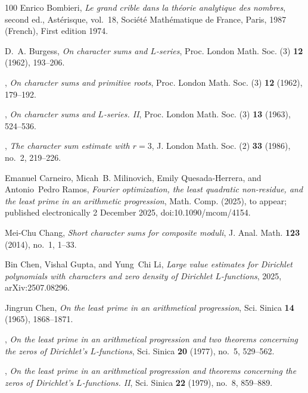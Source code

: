 \documentclass[11pt]{amsart}
\numberwithin{equation}{section}
\theoremstyle{plain}
\theoremstyle{definition}
\theoremstyle{remark}
\newcommand{\1}{\mathbf{1}}
\begin{document}
\begin{thebibliography}{100}
Enrico Bombieri, \emph{Le grand crible dans la th{\'e}orie analytique des
  nombres}, second ed., Ast{\'e}risque, vol.~18, Soci{\'e}t{\'e}
  Math{\'e}matique de France, Paris, 1987 (French), First edition 1974.

D.~A. Burgess, \emph{On character sums and {$L$}-series}, Proc. London Math.
  Soc. (3) \textbf{12} (1962), 193--206.

\bysame, \emph{On character sums and primitive roots}, Proc. London Math. Soc.
  (3) \textbf{12} (1962), 179--192.

\bysame, \emph{On character sums and {$L$}-series. {II}}, Proc. London Math.
  Soc. (3) \textbf{13} (1963), 524--536.

\bysame, \emph{The character sum estimate with {$r=3$}}, J. London Math. Soc.
  (2) \textbf{33} (1986), no.~2, 219--226.

Emanuel Carneiro, Micah~B. Milinovich, Emily Quesada-Herrera, and Antonio~Pedro
  Ramos, \emph{Fourier optimization, the least quadratic non-residue, and the
  least prime in an arithmetic progression}, Math. Comp. (2025), to appear;
  published electronically 2 December 2025, doi:10.1090/mcom/4154.

Mei-Chu Chang, \emph{Short character sums for composite moduli}, J. Anal. Math.
  \textbf{123} (2014), no.~1, 1--33.

Bin Chen, Vishal Gupta, and Yung~Chi Li, \emph{Large value estimates for
  {D}irichlet polynomials with characters and zero density of {D}irichlet
  {$L$}-functions}, 2025, arXiv:2507.08296.

Jingrun Chen, \emph{On the least prime in an arithmetical progression}, Sci.
  Sinica \textbf{14} (1965), 1868--1871. 

\bysame, \emph{On the least prime in an arithmetical progression and two
  theorems concerning the zeros of {D}irichlet's {$L$}-functions}, Sci. Sinica
  \textbf{20} (1977), no.~5, 529--562. 

\bysame, \emph{On the least prime in an arithmetical progression and theorems
  concerning the zeros of {D}irichlet's {$L$}-functions. {II}}, Sci. Sinica
  \textbf{22} (1979), no.~8, 859--889. 


\end{thebibliography}
\end{document}
